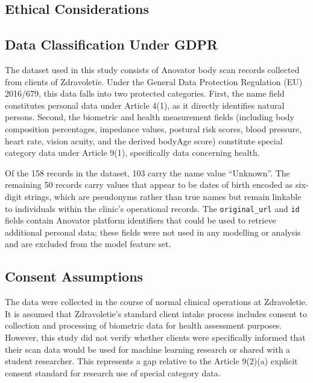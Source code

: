 \documentclass[11pt,a4paper]{report}
\begin{document}


\begin{appendices}

\chapter{Ethical Considerations}

\section{Data Classification Under GDPR}

The dataset used in this study consists of Anovator body scan records collected from clients of
Zdravoletie. Under the General Data Protection Regulation (EU) 2016/679, this data falls into two
protected categories. First, the name field constitutes personal data under Article 4(1), as it
directly identifies natural persons. Second, the biometric and health measurement fields
(including body composition percentages, impedance values, postural risk scores, blood pressure,
heart rate, vision acuity, and the derived bodyAge score) constitute special category data under
Article 9(1), specifically data concerning health.

Of the 158 records in the dataset, 103 carry the name value ``Unknown''. The remaining 50 records
carry values that appear to be dates of birth encoded as six-digit strings, which are pseudonyms
rather than true names but remain linkable to individuals within the clinic's operational records.
The \texttt{original\_url} and \texttt{id} fields contain Anovator platform identifiers that could
be used to retrieve additional personal data; these fields were not used in any modelling or
analysis and are excluded from the model feature set.

\section{Consent Assumptions}

The data were collected in the course of normal clinical operations at Zdravoletie. It is assumed
that Zdravoletie's standard client intake process includes consent to collection and processing of
biometric data for health assessment purposes. However, this study did not verify whether clients
were specifically informed that their scan data would be used for machine learning research or
shared with a student researcher. This represents a gap relative to the Article 9(2)(a) explicit
consent standard for research use of special category data.


\end{appendices}
\end{document}
